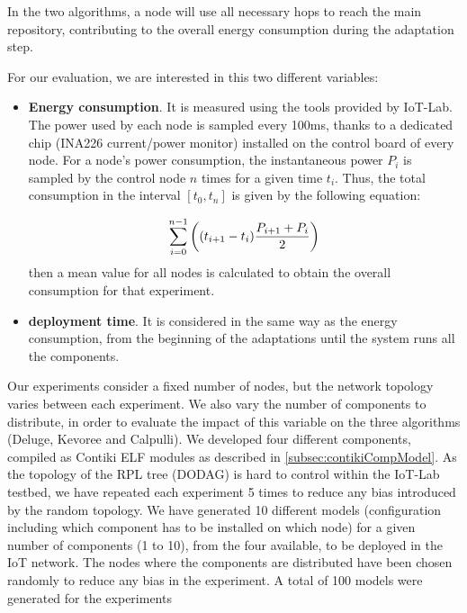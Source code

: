 In the two algorithms, a node will use all necessary hops to reach the main repository, contributing to the overall energy consumption during the adaptation step.

For our evaluation, we are interested in this two different variables:
\begin{itemize}
	\item\textbf{Energy consumption}.
	It is measured using the tools provided by IoT-Lab. 
	The power used by each node is sampled every 100ms, thanks to a dedicated chip (INA226 current/power monitor) installed on the control board of every node.
	For a node's power consumption, the instantaneous power $P_i$ is sampled by the control node $n$ times for a given time $t_i$.
	Thus, the total consumption in the interval $\left[t_0, t_n\right]$ is given by the following equation:
	
	\begin{equation}
	\hspace*{\stretch{1}}
		\sum_{i=0}^{n-1}{\left( (t_{i+1} - t_i) \frac{P_{i+1} + P_i}{2} \right)}
	\hspace*{\stretch{1}}
	\end{equation}
	then a mean value for all nodes is calculated to obtain the overall consumption for that experiment.
	\item\textbf{deployment time}.
	It is considered in the same way as the energy consumption, from the beginning of the adaptations until the system runs all the components.
\end{itemize}

Our experiments consider a fixed number of nodes, but the network topology varies between each experiment.
We also vary the number of components to distribute, in order to evaluate the impact of this variable on the three algorithms (Deluge, Kevoree and Calpulli).
We developed four different components, compiled as Contiki ELF modules as described in \ref{subsec:contikiCompModel}.
As the topology of the RPL tree (DODAG) is hard to control within the IoT-Lab testbed, we have repeated each experiment 5 times to reduce any bias introduced by the random topology.
We have generated 10 different models (configuration including which component has to be installed on which node) for a given number of components (1 to 10), from the four available, to be deployed in the IoT network.
The nodes where the components are distributed have been chosen randomly to reduce any bias in the experiment.
A total of 100 models were generated for the experiments

